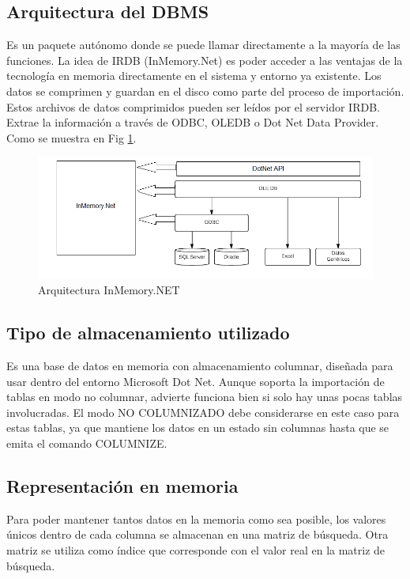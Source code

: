 \documentclass{acmart}
\begin{document}
\subsection{Arquitectura del DBMS}

Es un paquete autónomo donde se puede llamar directamente a la mayoría de las funciones. La idea de IRDB (InMemory.Net) es poder acceder a las ventajas de la tecnología en memoria directamente en el sistema y entorno ya existente. Los datos se comprimen y guardan en el disco como parte del proceso de importación. Estos archivos de datos comprimidos pueden ser leídos por el servidor IRDB. Extrae la información a través de ODBC, OLEDB o Dot Net Data Provider. Como se muestra en Fig \ref{irdb}.

\begin{figure}
	\includegraphics[width=\linewidth]{architecture_IRDB.png} %
	\caption{Arquitectura InMemory.NET} %
	\label{irdb} %
\end{figure}

\subsection{Tipo de almacenamiento utilizado}

Es una base de datos en memoria con almacenamiento columnar, diseñada para usar dentro del entorno Microsoft Dot Net. Aunque soporta la importación de tablas en modo no columnar, advierte funciona bien si solo hay unas pocas tablas involucradas. El modo NO COLUMNIZADO debe considerarse en este caso para estas tablas, ya que mantiene los datos en un estado sin columnas hasta que se emita el comando COLUMNIZE.

\subsection{Representación en memoria}

Para poder mantener tantos datos en la memoria como sea posible, los valores únicos dentro de cada columna se almacenan en una matriz de búsqueda. Otra matriz se utiliza como índice que corresponde con el valor real en la matriz de búsqueda.
\end{document}
